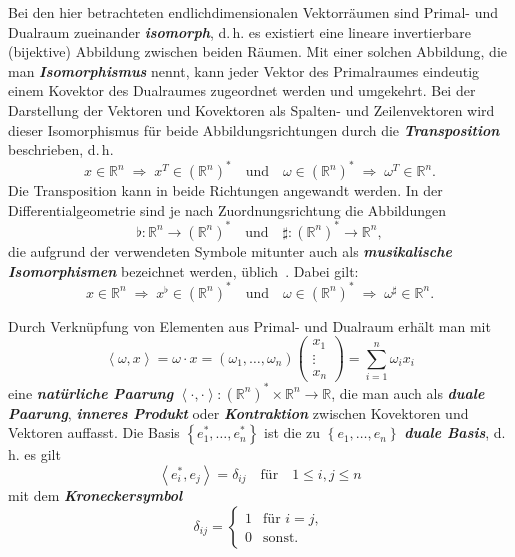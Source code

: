 \begin{remark}
\label{rem:Isomorphismus-Primal-Dual}Bei den hier betrachteten endlichdimensionalen
Vektorräumen sind Primal- und Dualraum zueinander \textbf{\em isomorph},
d.\,h. es existiert eine lineare invertierbare (bijektive) Abbildung
zwischen beiden Räumen. Mit einer solchen Abbildung, die man \textbf{\em Isomorphismus}
nennt, kann jeder Vektor des Primalraumes eindeutig einem Kovektor
des Dualraumes zugeordnet werden und umgekehrt. Bei der Darstellung
der Vektoren und Kovektoren als Spalten- und Zeilenvektoren wird dieser
Isomorphismus für beide Abbildungsrichtungen durch die \textbf{\em Transposition}
beschrieben, d.\,h.
\[
x\in{\mathbb{R}}^{n}\;\Rightarrow\;x^{T}\in({\mathbb{R}}^{n})^{*}\quad\text{und}\quad\omega\in({\mathbb{R}}^{n})^{*}\;\Rightarrow\;\omega^{T}\in{\mathbb{R}}^{n}.
\]
Die Transposition kann in beide Richtungen angewandt werden. In der
Differentialgeometrie sind je nach Zuordnungsrichtung die Abbildungen
\[
\flat:{\mathbb{R}}^{n}\to({\mathbb{R}}^{n})^{*}\quad\text{und}\quad\sharp:({\mathbb{R}}^{n})^{*}\to{\mathbb{R}}^{n},
\]
die aufgrund der verwendeten Symbole mitunter auch als \textbf{\em musikalische
Isomorphismen} bezeichnet werden,
üblich~\cite{marsden2001,bullo2004,jaenich2005}. Dabei gilt:
\[
x\in{\mathbb{R}}^{n}\;\Rightarrow\;x^{\flat}\in({\mathbb{R}}^{n})^{*}\quad\text{und}\quad\omega\in({\mathbb{R}}^{n})^{*}\;\Rightarrow\;\omega^{\sharp}\in{\mathbb{R}}^{n}.
\]
\end{remark}

Durch Verknüpfung von Elementen aus Primal- und Dualraum erhält man
mit
\begin{equation}
\left\langle \omega,x\right\rangle =\omega\cdot x=\left(\omega_{1},\ldots,\omega_{n}\right)\left(\begin{array}{c}
x_{1}\\
\vdots\\
x_{n}
\end{array}\right)=\sum_{i=1}^{n}\omega_{i}x_{i}\label{eq:inneres-produkt}
\end{equation}
eine \textbf{\em natürliche Paarung}  $\left\langle \cdot,\cdot\right\rangle :({\mathbb{R}}^{n})^{*}\times{\mathbb{R}}^{n}\to{\mathbb{R}}$,
die man auch als \textbf{\em duale Paarung}, \textbf{\em inneres Produkt}
oder \textbf{\em Kontraktion} zwischen Kovektoren und Vektoren auffasst.
Die Basis $\left\{ e_{1}^{*},\ldots,e_{n}^{*}\right\} $ ist die zu
$\left\{ e_{1},\ldots,e_{n}\right\} $ \textbf{\em duale Basis}, d.\,h.
es gilt
\[
\left\langle e_{i}^{*},e_{j}\right\rangle =\delta_{ij}\quad\textrm{für}\quad1\leq i,j\leq n
\]
mit dem \textbf{\em Kroneckersymbol}
\[
\delta_{ij}=\left\{ \begin{array}{cl}
1 & \textrm{für }i=j,\\
0 & \textrm{sonst.}
\end{array}\right.
\]

